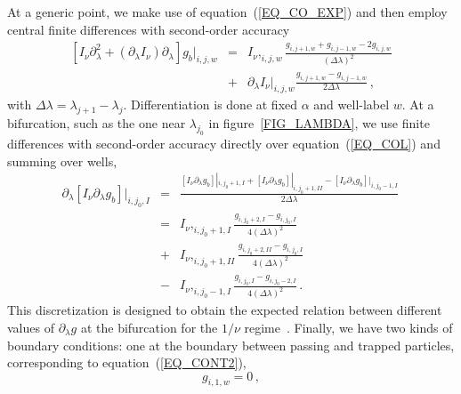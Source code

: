  At a generic point, we make use of equation~(\ref{EQ_CO_EXP}) and then employ central finite differences with second-order accuracy
\begin{eqnarray}
\left[ I_\nu \partial^2_\lambda  + (\partial_\lambda I_\nu) \partial_\lambda \right] g_b|_{i,j,w}&=& I_\nu,_{i,j,w} \frac{g_{i,j+1,w}+g_{i,j-1,w}-2g_{i,j,w}}{(\Delta\lambda)^2}\nonumber\\&+&\partial_\lambda I_\nu |_{i,j,w} \frac{g_{i,j+1,w}-g_{i,j-1,w}}{2\Delta\lambda}\,,
\label{EQ_D2LAMBDA}
\end{eqnarray}
with $\Delta\lambda=\lambda_{j+1}-\lambda_j$. Differentiation is done at fixed $\alpha$ and well-label $w$. At a bifurcation, such as the one near $\lambda_{j_0}$ in figure~\ref{FIG_LAMBDA}, we use finite differences with second-order accuracy directly over equation~(\ref{EQ_COL}) and summing over wells,
\begin{eqnarray}
\partial_\lambda\left[ I_\nu \partial_\lambda g_b\right]|_{i,j_0,I}&=& \frac{[I_\nu \partial_\lambda g_b]|_{i,j_0+1,I} +  [I_\nu \partial_\lambda g_b]|_{i,j_0+1,II} -   [I_\nu \partial_\lambda g_b]|_{i,j_0-1,I}}{2\Delta\lambda}\,\nonumber\\
&=& I_\nu,_{i,j_0+1,I}\frac{g_{i,j_0+2,I}-g_{i,j_0,I}}{4(\Delta\lambda)^2}\nonumber\\
&+& I_\nu,_{i,j_0+1,II}\frac{g_{i,j_0+2,II}-g_{i,j_0,I}}{4(\Delta\lambda)^2}\nonumber\\
&-&I_\nu,_{i,j_0-1,I}\frac{g_{i,j_0,I}-g_{i,j_0-2,I}}{4(\Delta\lambda)^2}\,.\label{EQ_DLAMBDABIF}
\end{eqnarray}
This discretization is designed to obtain the expected relation between different values of $\partial_\lambda g$ at the bifurcation for the $1/\nu$ regime~\citep{nemov1999neo,calvo2014er}. Finally, we have two kinds of boundary conditions: one at the boundary between passing and trapped particles, corresponding to equation~(\ref{EQ_CONT2}),
\begin{equation}
g_{i,1,w}=0\,,
\label{EQ_TOP}
\end{equation}

